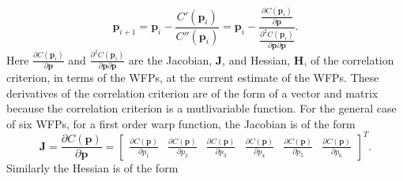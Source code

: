 \documentclass[12pt,oneside,openany,a4paper, %
english, %
masters-t, goldenblock]{usthesis}
\begin{document}
\begin{equation}
  \label{eq: NR cor}
  \bm{p}_{i+1}=\bm{p}_i-\frac{C'(\bm{p}_i)}{C''(\bm{p}_i)} = \bm{p}_i-\frac{\frac{\partial C(\bm{p}_i)}{\partial \bm{p}}}{\frac{\partial ^2 C(\bm{p}_i)}{\partial \bm{p} \partial \bm{p}}} .
\end{equation}
Here $\frac{\partial C(\bm{p}_i)}{\partial \bm{p}}$ and $\frac{\partial ^2 C(\bm{p}_i)}{\partial \bm{p} \partial \bm{p}}$ are the Jacobian, $\bm{J}$, and Hessian, $\bm{H}$, of the correlation criterion, in terms of the WFPs, at the current estimate of the WFPs. These derivatives of the correlation criterion are of the form of a vector and matrix because the correlation criterion is a mutlivariable function. For the general case of six WFPs, for a first order warp function, the Jacobian is of the form
\begin{equation}
  \label{eq: jacobian}
  \bm{J}=\frac{\partial C(\bm{p})}{\partial \bm{p}}=\begin{bmatrix}
  \frac{\partial C(\bm{p})}{\partial p_1} &
  \frac{\partial C(\bm{p})}{\partial p_2} &
  \frac{\partial C(\bm{p})}{\partial p_3} &
  \frac{\partial C(\bm{p})}{\partial p_4} &
  \frac{\partial C(\bm{p})}{\partial p_5} &
  \frac{\partial C(\bm{p})}{\partial p_6} 
  \end{bmatrix}^T.
\end{equation}
Similarly the Hessian is of the form
\end{document}
